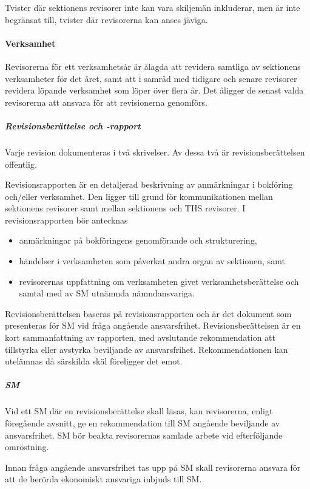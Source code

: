 \documentclass[a4paper,12pt]{article}
\begin{document}
Tvister där sektionens revisorer inte kan vara skiljemän inkluderar, men är inte begränsat till, tvister där revisorerna kan anses jäviga.

\paragraph{Verksamhet}

Revisorerna för ett verksamhetsår är ålagda att revidera samtliga av sektionens verksamheter för det året, samt att i samråd med tidigare och senare revisorer revidera löpande verksamhet som löper över flera år. Det åligger de senast valda revisorerna att ansvara för att revisionerna genomförs.

\subparagraph{Revisionsberättelse och -rapport}

Varje revision dokumenteras i två skrivelser. Av dessa två är revisionsberättelsen offentlig.

Revisionsrapporten är en detaljerad beskrivning av anmärkningar i bokföring och/eller verksamhet. Den ligger till grund för kommunikationen mellan sektionens revisorer samt mellan sektionens och THS revisorer. I revisionsrapporten bör antecknas

\begin{itemize}
  \item anmärkningar på bokföringens genomförande och strukturering,
  \item händelser i verksamheten som påverkat andra organ av sektionen, samt
  \item revisorernas uppfattning om verksamheten givet verksamhetsberättelse och samtal med av SM utnämnda nämndansvariga.
\end{itemize}

Revisionsberättelsen baseras på revisionsrapporten och är det dokument som presenteras för SM vid fråga angående ansvarsfrihet. Revisionsberättelsen är en kort sammanfattning av rapporten, med avslutande rekommendation att tillstyrka eller avstyrka beviljande av ansvarsfrihet. Rekommendationen kan utelämnas då särskilda skäl föreligger det emot.

\subparagraph{SM}

Vid ett SM där en revisionsberättelse skall läsas, kan revisorerna, enligt föregående avsnitt, ge en rekommendation till SM angående beviljande av ansvarsfrihet. SM bör beakta revisorernas samlade arbete vid efterföljande omröstning.

Innan fråga angående ansvarsfrihet tas upp på SM skall revisorerna ansvara för att de berörda ekonomiskt ansvariga inbjuds till SM.
\end{document}
